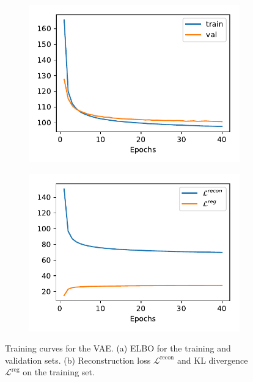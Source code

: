 \documentclass{article}
\begin{document}
\begin{figure}[t]
\begin{subfigure}{0.49\textwidth}
\centering
\includegraphics[scale=0.7]{img/elbo.pdf}
\caption{}
\label{fig:vae_curves_a}
\end{subfigure}
\begin{subfigure}{0.49\textwidth}
\centering
\includegraphics[scale=0.7]{img/recon_reg_losses.pdf}
\caption{}
\label{fig:vae_curves_b}
\end{subfigure}
 \caption{Training curves for the VAE. (a) ELBO for the training and validation sets. (b) Reconstruction loss $\mathcal{L}^{\text{recon}}$ and KL divergence $\mathcal{L}^{\text{reg}}$ on the training set.}
\label{fig:vae_curves}
\end{figure}
\end{document}
